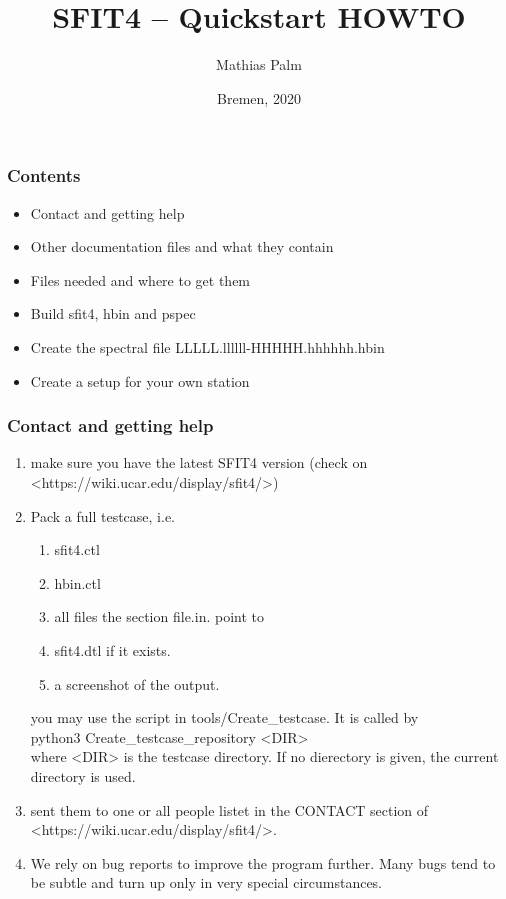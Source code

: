 \documentclass[notes=hide]{beamer}
\title {SFIT4 -- Quickstart HOWTO}
\author[Mathias Palm]{Mathias Palm}
\date{Bremen, 2020}
\begin{document}
\begin{frame}
\maketitle
\end{frame}



\begin{frame}
  \frametitle{Contents}
  \begin{itemize}
  \item Contact and getting help
  \item Other documentation files and what they contain
  \item Files needed and where to get them
  \item Build sfit4, hbin and pspec
  \item Create the spectral file LLLLL.llllll-HHHHH.hhhhhh.hbin
  \item Create a setup for your own station
  \end{itemize}
\end{frame}

\begin{frame}
  \frametitle{Contact and getting help}
  \begin{enumerate}
  \item make sure you have the latest SFIT4 version (check on <https://wiki.ucar.edu/display/sfit4/>)
  \item Pack a full testcase, i.e.
    \begin{enumerate}
    \item sfit4.ctl
    \item hbin.ctl
    \item all files the section file.in. point to
    \item sfit4.dtl if it exists.
    \item a screenshot of the output.
    \end{enumerate}
    you may use the script in tools/Create\_testcase. It is called by\\
    python3 Create\_testcase\_repository <DIR>\\
    where <DIR> is the testcase directory. If no dierectory is given,
    the current directory is used.
  \item sent them to one or all people listet in the CONTACT section
    of <https://wiki.ucar.edu/display/sfit4/>.
  \item We rely on bug reports to improve the program further. Many
    bugs tend to be subtle and turn up only in very special
    circumstances.
  \end{enumerate}

\end{frame}
\end{document}
